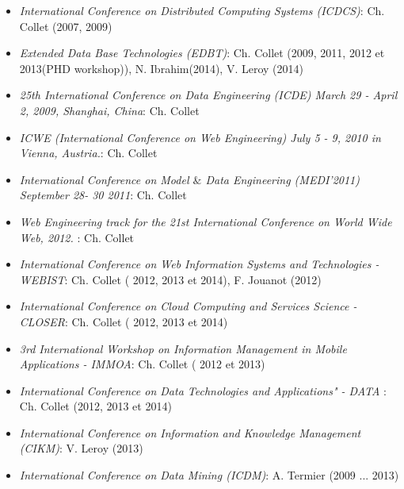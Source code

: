 \begin{itemize}

\setlength{\itemindent}{-0.5cm}
\setlength{\itemsep}{-0.1cm}

\item {\it International Conference on Distributed Computing Systems (ICDCS)}: Ch. Collet (2007, 2009)

\item {\it Extended Data Base Technologies (EDBT)}:  Ch. Collet (2009, 2011, 2012 et 2013(PHD workshop)), N. Ibrahim(2014), V. Leroy (2014)

\item {\it 25th International Conference on Data Engineering (ICDE) March 29 - April 2, 2009, Shanghai, China}:  Ch. Collet 

\item {\it ICWE (International Conference on Web Engineering) July 5 - 9, 2010 in Vienna, Austria.}:  Ch. Collet 

\item {\it International Conference on Model $\&$ Data Engineering (MEDI'2011) September 28- 30 2011}:  Ch. Collet

\item {\it Web Engineering track for the 21st International Conference on World Wide Web, 2012. }:  Ch. Collet 

\item {\it International Conference on Web Information Systems and Technologies  - WEBIST}:  Ch. Collet ( 2012, 2013 et 2014), F. Jouanot (2012)

\item {\it International Conference on Cloud Computing and Services Science - CLOSER}:  Ch. Collet ( 2012, 2013 et 2014)

\item {\it 3rd International Workshop on Information Management in Mobile Applications - IMMOA}:  Ch. Collet ( 2012 et 2013)

\item {\it International Conference on Data Technologies and Applications" - DATA }:  Ch. Collet (2012, 2013 et 2014)

\item {\it International Conference on Information and Knowledge Management (CIKM)}: V. Leroy (2013)

\item {\it International Conference on Data Mining (ICDM)}: A. Termier (2009 ... 2013)


\end{itemize}
